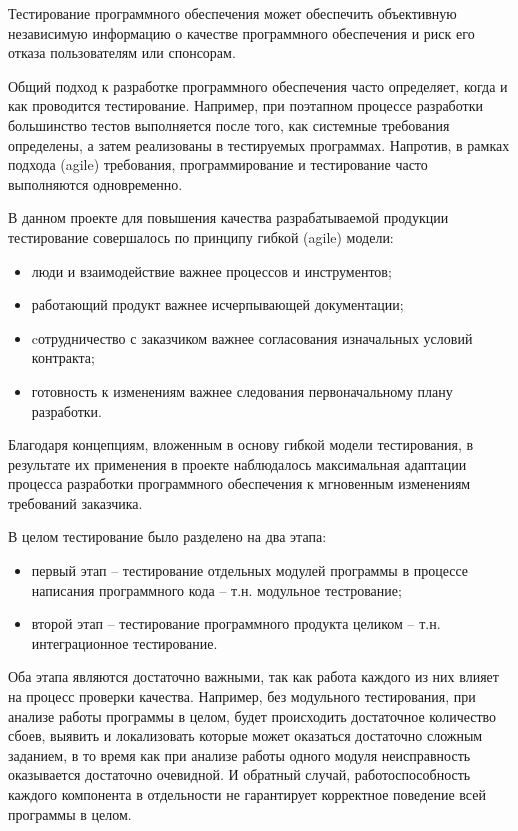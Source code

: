 Тестирование программного обеспечения может обеспечить объективную независимую информацию о качестве программного обеспечения и риск его отказа пользователям или спонсорам.

Общий подход к разработке программного обеспечения часто определяет, когда и как проводится тестирование. Например, при поэтапном процессе разработки большинство тестов выполняется после того, как системные требования определены, а затем реализованы в тестируемых программах. Напротив, в рамках подхода (agile) требования, программирование и тестирование часто выполняются одновременно.


В данном проекте для повышения качества разрабатываемой продукции тестирование совершалось по принципу гибкой (agile) модели:

\begin{itemize}
\item{люди и взаимодействие важнее процессов и инструментов;}
\item{работающий продукт важнее исчерпывающей документации;}
\item{cотрудничество с заказчиком важнее согласования изначальных условий контракта;}
\item{готовность к изменениям важнее следования первоначальному плану разработки.}
\end{itemize}

Благодаря концепциям, вложенным в основу гибкой модели тестирования, в результате их применения в проекте наблюдалось максимальная адаптации процесса разработки программного обеспечения к мгновенным изменениям требований заказчика.

В целом тестирование было разделено на два этапа:

\begin{itemize}
\item{первый этап -- тестирование отдельных модулей программы в процессе написания программного кода -- т.н. модульное тестрование;}
\item{второй этап -- тестирование программного продукта целиком -- т.н. интеграционное тестирование.}
\end{itemize}

Оба этапа являются достаточно важными, так как работа каждого из них влияет на процесс проверки качества. Например, без модульного тестирования, при анализе работы программы в целом, будет происходить достаточное количество сбоев, выявить и локализовать которые может оказаться достаточно сложным заданием, в то время как при анализе работы одного модуля неисправность оказывается достаточно очевидной. И обратный случай, работоспособность каждого компонента в отдельности не гарантирует корректное поведение всей программы в целом.

